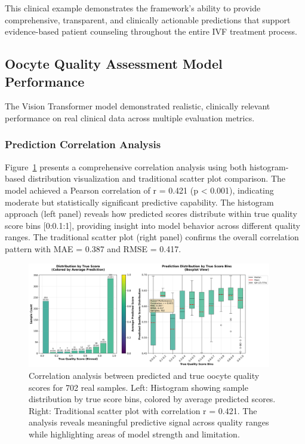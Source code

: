 This clinical example demonstrates the framework's ability to provide comprehensive, transparent, and clinically actionable predictions that support evidence-based patient counseling throughout the entire IVF treatment process.

\subsection{Oocyte Quality Assessment Model Performance}

The Vision Transformer model demonstrated realistic, clinically relevant performance on real clinical data across multiple evaluation metrics.

\subsubsection{Prediction Correlation Analysis}

Figure~\ref{fig:oocyte_correlation} presents a comprehensive correlation analysis using both histogram-based distribution visualization and traditional scatter plot comparison. The model achieved a Pearson correlation of r = 0.421 (p < 0.001), indicating moderate but statistically significant predictive capability. The histogram approach (left panel) reveals how predicted scores distribute within true quality score bins [0:0.1:1], providing insight into model behavior across different quality ranges. The traditional scatter plot (right panel) confirms the overall correlation pattern with MAE = 0.387 and RMSE = 0.417.

\begin{figure}[H]
    \centering
    \includegraphics[width=0.95\textwidth]{figures/oocyte_correlation.png}
    \caption{Correlation analysis between predicted and true oocyte quality scores for 702 real samples. Left: Histogram showing sample distribution by true score bins, colored by average predicted scores. Right: Traditional scatter plot with correlation r = 0.421. The analysis reveals meaningful predictive signal across quality ranges while highlighting areas of model strength and limitation.}
    \label{fig:oocyte_correlation}
\end{figure}


